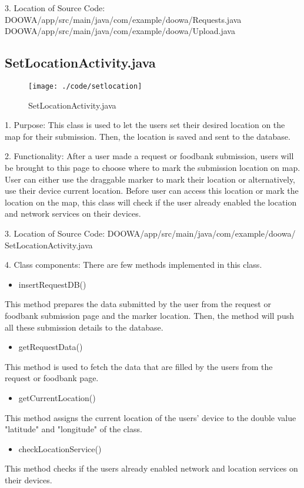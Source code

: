 \documentclass[conference]{IEEEtran}
\begin{document}
3. Location of Source Code: DOOWA/app/src/main/java/com/example/doowa/Requests.java\\
 DOOWA/app/src/main/java/com/example/doowa/Upload.java
\break
\break
\subsection{SetLocationActivity.java}
\begin{figure}[h!]
\texttt{[image: ./code/setlocation]}
\centering
\caption{SetLocationActivity.java}
\end{figure}
1. Purpose: This class is used to let the users set their desired location on the map for their submission. Then, the location is saved and sent to the database.\break
\par 2. Functionality: After a user made a request or foodbank submission, users will be brought to this page to choose where to mark the submission location on map. User can either use the draggable marker to mark their location or alternatively, use their device current location. Before user can access this location or mark the location on the map, this class will check if the user already enabled the location and network services on their devices. \break

3. Location of Source Code: DOOWA/app/src/main/java/com/example/doowa/ SetLocationActivity.java\break

4. Class components: There are few methods implemented in this class.
\begin{itemize}
\item insertRequestDB()
\end{itemize}
This method prepares the data submitted by the user from the request or foodbank submission page and the marker location. Then, the method will push all these submission details to the database. 
\begin{itemize}
\item  getRequestData()
\end{itemize}
This method is used to fetch the data that are filled by the users from the request or foodbank page.
\begin{itemize}
\item getCurrentLocation()
\end{itemize}
This method assigns the current location of the users' device to the double value "latitude" and "longitude" of the class.
\begin{itemize}
\item checkLocationService()
\end{itemize}
This method checks if the users already enabled network and location services on their devices.
\newpage
\end{document}
